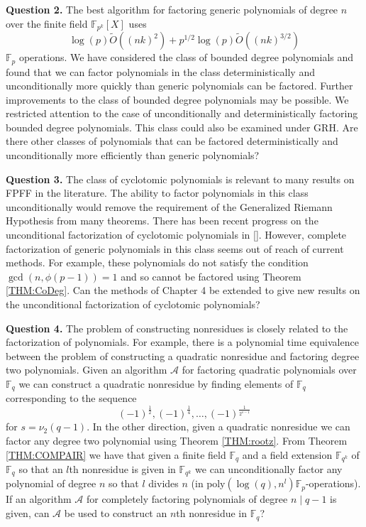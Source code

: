 \documentclass{article}
\theoremstyle{plain}
\theoremstyle{definition}
\def\Fp {{ \mathbb{F} _ {p} }}
\def\Fq {{ \mathbb{F} _ {q} }}
\def\mcA  {{ \mathcal{A}}}
\def\poly {{ \mathrm{poly} }}
\begin{document}
		\textbf{Question 2.} The best algorithm for factoring generic polynomials of degree $n$ over the finite field $\mathbb{F}_{p^k}[X]$ uses 
		    \[ \log(p)\tilde{O}((nk)^2) + p^{1 / 2} \log(p) \tilde{O}((nk)^{3/2}) \] 
		\noindent $\Fp$ operations. We have considered the class of bounded degree polynomials and found that we can factor polynomials in the class deterministically and unconditionally more quickly than generic polynomials can be factored. Further improvements to the class of bounded degree polynomials may be possible. We restricted attention to the case of unconditionally and deterministically factoring bounded degree polynomials. This class could also be examined under GRH. Are there other classes of polynomials that can be factored deterministically and unconditionally more efficiently than generic polynomials? 
		
		\textbf{Question 3.} The class of cyclotomic polynomials is relevant to many results on FPFF in the literature. The ability to factor polynomials in this class unconditionally would remove the requirement of the Generalized Riemann Hypothesis from many theorems. There has been recent progress on the unconditional factorization of cyclotomic polynomials in []. However, complete factorization of generic polynomials in this class seems out of reach of current methods. For example, these polynomials do not satisfy the condition $\gcd(n,\phi(p-1))=1$ and so cannot be factored using Theorem \ref{THM:CoDeg}. Can the methods of Chapter 4 be extended to give new results on the unconditional factorization of cyclotomic polynomials?
		
		\textbf{Question 4.} The problem of constructing nonresidues is closely related to the factorization of polynomials. For example, there is a polynomial time equivalence between the problem of constructing a quadratic nonresidue and factoring degree two polynomials. Given an algorithm $\mcA$ for factoring quadratic polynomials over $\Fq$ we can construct a quadratic nonresidue by finding elements of $\Fq$ corresponding to the sequence 
		\[ (-1)^{\frac{1}{2}},(-1)^{\frac{1}{4}},\ldots,(-1)^{\frac{1}{2^{s-1}}} \]
		\noindent for $s=\nu_2(q-1)$. In the other direction, given a quadratic nonresidue we can factor any degree two polynomial using Theorem \ref{THM:rootz}. 
		From Theorem \ref{THM:COMPAIR} we have that given a finite field $\Fq$ and a field extension $\mathbb{F}_{q^k}$ of $\Fq$ so that an $l$th nonresidue is given in $\mathbb{F}_{q^k}$ we can unconditionally factor any polynomial of degree $n$ so that $l$ divides $n$ (in $\poly(\log(q),n^l) \Fp$-operations). If an algorithm $\mcA$ for completely factoring polynomials of degree $n \mid q-1$ is given, can $\mcA$ be used to construct an $n$th nonresidue in $\Fq$? 
		
\end{document}
